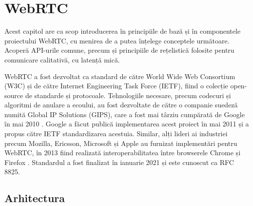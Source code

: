 \chapter{WebRTC}
\label{chap:ch3}

\indent \par Acest capitol are ca scop introducerea în principiile de bază și în componentele proiectului WebRTC, cu menirea de a putea înțelege conceptele următoare. Acoperă API-urile comune, precum și principiile de rețelistică folosite pentru comunicare calitativă, cu latență mică.
\indent \par WebRTC a fost dezvoltat ca standard de către World Wide Web Consortium (W3C) și de către Internet Engineering Task Force (IETF), fiind o colecție open-source de standarde și protocoale. Tehnologiile necesare, precum codecuri și algoritmi de anulare a ecoului, au fost dezvoltate de către o companie suedeză numită Global IP Solutions (GIPS), care a fost mai târziu cumpărată de Google în mai 2010 \cite{WebNSM2017}. Google a făcut publică implementarea acest proiect în mai 2011 și a propus către IETF standardizarea acestuia. Similar, alți lideri ai industriei precum Mozilla, Ericsson, Microsoft și Apple au furnizat implementări pentru WebRTC, în 2013 fiind realizată interoperabilitatea între browserele Chrome și Firefox \cite{Nyman2013}. Standardul a fost finalizat în ianuarie 2021 și este cunoscut ca RFC 8825.

\section{Arhitectura}
\label{sec:ch3sec1}

